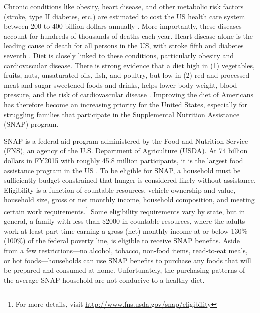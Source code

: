 \documentclass[12pt,letterpaperpaper,]{book}
\begin{document}
Chronic conditions like obesity, heart disease, and other metabolic risk
factors (stroke, type II diabetes, etc.) are estimated to cost the US
health care system between 200 to 400 billion dollars annually
\citep{cawley_medical_2012, chatterjee_checkup_2014}. More importantly,
these diseases account for hundreds of thousands of deaths each year.
Heart disease alone is the leading cause of death for all persons in the
US, with stroke fifth and diabetes seventh
\citep{national_center_for_health_statistics_health_2015}. Diet is
closely linked to these conditions, particularly obesity and
cardiovascular disease. There is strong evidence that a diet high in (1)
vegetables, fruits, nuts, unsaturated oils, fish, and poultry, but low
in (2) red and processed meat and sugar-sweetened foods and drinks,
helps lower body weight, blood pressure, and the risk of cardiovascular
disease
\citep{mente_systematic_2009, nutrition_evidence_library_series_2014}.
Improving the diet of Americans has therefore become an increasing
priority for the United States, especially for struggling families that
participate in the Supplemental Nutrition Assistance (SNAP) program.

SNAP is a federal aid program administered by the Food and Nutrition
Service (FNS), an agency of the U.S. Department of Agriculture (USDA).
At 74 billion dollars in FY2015 with roughly 45.8 million participants,
it is the largest food assistance program in the US
\citep{usda_fns_supplemental_2016}. To be eligible for SNAP, a household
must be sufficiently budget constrained that hunger is considered likely
without assistance. Eligibility is a function of countable resources,
vehicle ownership and value, household size, gross or net monthly
income, household composition, and meeting certain work
requirements.\footnote{For more details, visit
  \url{http://www.fns.usda.gov/snap/eligibility}} Some eligibility
requirements vary by state, but in general, a family with less than
\$2000 in countable resources, where the adults work at least part-time
earning a gross (net) monthly income at or below 130\% (100\%) of the
federal poverty line, is eligible to receive SNAP benefits. Aside from a
few restrictions---no alcohol, tobacco, non-food items, read-to-eat
meals, or hot foods---households can use SNAP benefits to purchase any
foods that will be prepared and consumed at home. Unfortunately, the
purchasing patterns of the average SNAP household are not conducive to a
healthy diet.
\end{document}
